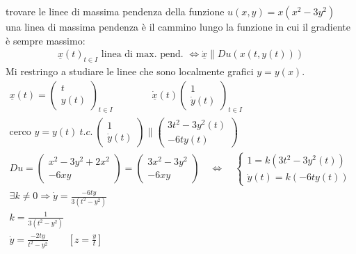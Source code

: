 \documentclass[a4paper, oneside]{article}
\begin{document}
\begin{example}
    trovare le linee di massima pendenza della funzione $u(x,y) = x(x^2-3y^2)$\\
    una linea di massima pendenza è il cammino lungo la funzione in cui il gradiente è sempre massimo:
    \begin{gather*}
        \underline{x}(t)_{t \in I} \text{ linea di max. pend. } \Leftrightarrow \underline{\dot{x}} \parallel Du(x(t,y(t)))
    \end{gather*}
    Mi restringo a studiare le linee che sono localmente grafici $y=y(x)$.\\
    \begin{gather*}
        \underline{x}(t) = \begin{pmatrix}
             t \\
             y(t)
        \end{pmatrix}_{t \in I} \qquad \qquad \underline{\dot{x}}(t) \begin{pmatrix}
            1\\
            \dot{y}(t)
        \end{pmatrix}_{t \in I}\\
        \text{cerco } y = y(t) \ t.c. \ \begin{pmatrix}
            1\\
            \dot{y}(t) 
        \end{pmatrix}\parallel \begin{pmatrix}
            3t^2 - 3y^2(t)\\
            -6t y (t)
        \end{pmatrix}\\
        Du = \begin{pmatrix}
            x^2-3y^2 + 2x^2\\
            -6xy
        \end{pmatrix} = \begin{pmatrix}
            3x^2 - 3y^2\\
            -6xy
        \end{pmatrix} \quad \Leftrightarrow \quad \begin{cases}
            1 = k(3t^2 - 3y^2(t))\\
            \dot{y}(t) = k (-6 t y(t))
        \end{cases}\\
        \exists k \neq 0 \Rightarrow \dot{y} = \frac{-6ty}{3(t^2-y^2)}\\
        k = \frac{1}{3(t^2-y^2)}\\
        \dot{y} = \frac{-2ty}{t^2-y^2} \qquad [z = \frac{y}{t}]
    \end{gather*}
\end{example}
\newpage
\end{document}
